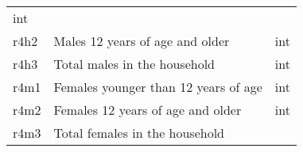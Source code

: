 \documentclass[11pt]{article}
\begin{document}
\begin{longtable}[]{@{}lll@{}}
\begin{minipage}[t]{0.24\columnwidth}
int\strut
\end{minipage}\tabularnewline
\begin{minipage}[t]{0.19\columnwidth}\raggedright\strut
r4h2\strut
\end{minipage} & \begin{minipage}[t]{0.16\columnwidth}\raggedright\strut
Males 12 years of age and older\strut
\end{minipage} & \begin{minipage}[t]{0.24\columnwidth}\raggedright\strut
int\strut
\end{minipage}\tabularnewline
\begin{minipage}[t]{0.19\columnwidth}\raggedright\strut
r4h3\strut
\end{minipage} & \begin{minipage}[t]{0.16\columnwidth}\raggedright\strut
Total males in the household\strut
\end{minipage} & \begin{minipage}[t]{0.24\columnwidth}\raggedright\strut
int\strut
\end{minipage}\tabularnewline
\begin{minipage}[t]{0.19\columnwidth}\raggedright\strut
r4m1\strut
\end{minipage} & \begin{minipage}[t]{0.16\columnwidth}\raggedright\strut
Females younger than 12 years of age\strut
\end{minipage} & \begin{minipage}[t]{0.24\columnwidth}\raggedright\strut
int\strut
\end{minipage}\tabularnewline
\begin{minipage}[t]{0.19\columnwidth}\raggedright\strut
r4m2\strut
\end{minipage} & \begin{minipage}[t]{0.16\columnwidth}\raggedright\strut
Females 12 years of age and older\strut
\end{minipage} & \begin{minipage}[t]{0.24\columnwidth}\raggedright\strut
int\strut
\end{minipage}\tabularnewline
\begin{minipage}[t]{0.19\columnwidth}\raggedright\strut
r4m3\strut
\end{minipage} & \begin{minipage}[t]{0.16\columnwidth}\raggedright\strut
Total females in the household\strut
\end{minipage} & \begin{minipage}[t]{0.24\columnwidth}\raggedright\strut

\end{minipage}
\end{longtable}
\end{document}
